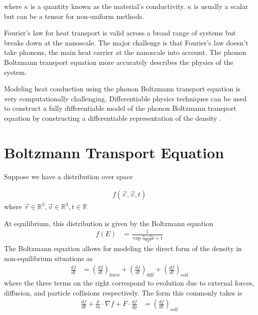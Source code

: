 \documentclass[book.tex]{subfiles}
\begin{document}
where $\kappa$ is a quantity known as the material's conductivity. $\kappa$ is usually a scalar but can be a tensor for non-uniform methods. 

Fourier's law for heat transport is valid across a broad range of systems but breaks down at the nanoscale. The major challenge is that Fourier's law doesn't take phonons, the main heat carrier at the nanoscale into account. The phonon Boltzmann transport equation more accurately describes the physics of the system. 

Modeling heat conduction using the phonon Boltzmann transport equation is very computationally challenging. Differentiable physics techniques can be used to construct a fully differentiable model of the phonon Boltzmann transport equation by constructing a differentiable representation of the density
\cite{romano2022differentiable}
\cite{romano2021openbte}.


\section{Boltzmann Transport Equation}

Suppose we have a distribution over space

\begin{align}
f(\vec{r}, \vec{v}, t)
\end{align}
where $\vec{r} \in \mathbb{R}^3, \vec{v} \in \mathbb{R}^3, t \in \mathbb{R}$

At equilibrium, this distribution is given by the Boltzmann equation
\begin{align}
    f(E) &= \frac{1}{\exp{\frac{E-E_F}{k_B T}} + 1}
\end{align}
The Boltzmann equation allows for modeling the direct form of the density in non-equilibrium situations as
\begin{align}
    \frac{df}{dt} &= \left ( \frac{df}{dt} \right )_{\mathrm{force}} + \left ( \frac{df}{dt} \right )_{\mathrm{diff}} + \left ( \frac{df}{dt} \right )_{\mathrm{coll}}
\end{align}
where the three terms on the right correspond to evolution due to external forces, diffusion, and particle collisions respectively. The form this commonly takes is
\begin{align}
    \frac{df}{dt} + \frac{p}{m} \cdot \nabla f + F \cdot \frac{df}{dp} &= \left ( \frac{df}{dt} \right )_{\mathrm{coll}}
\end{align}
\end{document}
